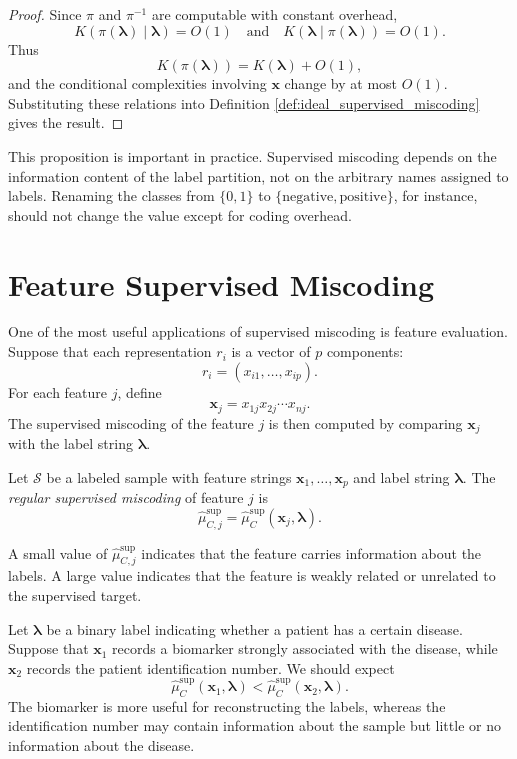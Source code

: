 \begin{proof}
Since \(\pi\) and \(\pi^{-1}\) are computable with constant overhead,
\[
    K(\pi(\boldsymbol{\lambda})\mid \boldsymbol{\lambda})=O(1)
    \quad\text{and}\quad
    K(\boldsymbol{\lambda}\mid \pi(\boldsymbol{\lambda}))=O(1).
\]
Thus
\[
    K(\pi(\boldsymbol{\lambda})) = K(\boldsymbol{\lambda})+O(1),
\]
and the conditional complexities involving \(\mathbf{x}\) change by at most \(O(1)\). Substituting these relations into Definition \ref{def:ideal_supervised_miscoding} gives the result.
\end{proof}

This proposition is important in practice. Supervised miscoding depends on the information content of the label partition, not on the arbitrary names assigned to labels. Renaming the classes from \(\{0,1\}\) to \(\{\text{negative},\text{positive}\}\), for instance, should not change the value except for coding overhead.

\section{Feature Supervised Miscoding}
\label{sec:feature_supervised_miscoding}

One of the most useful applications of supervised miscoding is feature evaluation. Suppose that each representation \(r_i\) is a vector of \(p\) components:
\[
    r_i=(x_{i1},\ldots,x_{ip}).
\]
For each feature \(j\), define
\[
    \mathbf{x}_j=x_{1j}x_{2j}\cdots x_{nj}.
\]
The supervised miscoding of the feature \(j\) is then computed by comparing \(\mathbf{x}_j\) with the label string \(\boldsymbol{\lambda}\).

\begin{definition}
\label{def:feature_supervised_miscoding}
Let \(\mathcal S\) be a labeled sample with feature strings \(\mathbf{x}_1,\ldots,\mathbf{x}_p\) and label string \(\boldsymbol{\lambda}\). The \emph{regular supervised miscoding} of feature \(j\) is
\[
    \hat\mu_{C,j}^{\mathrm{sup}}
    =
    \hat\mu_C^{\mathrm{sup}}(\mathbf{x}_j,\boldsymbol{\lambda}).
\]
\end{definition}

A small value of \(\hat\mu_{C,j}^{\mathrm{sup}}\) indicates that the feature carries information about the labels. A large value indicates that the feature is weakly related or unrelated to the supervised target.

\begin{example}
Let \(\boldsymbol{\lambda}\) be a binary label indicating whether a patient has a certain disease. Suppose that \(\mathbf{x}_1\) records a biomarker strongly associated with the disease, while \(\mathbf{x}_2\) records the patient identification number. We should expect
\[
    \hat\mu_C^{\mathrm{sup}}(\mathbf{x}_1,\boldsymbol{\lambda})
    <
    \hat\mu_C^{\mathrm{sup}}(\mathbf{x}_2,\boldsymbol{\lambda}).
\]
The biomarker is more useful for reconstructing the labels, whereas the identification number may contain information about the sample but little or no information about the disease.
\end{example}

